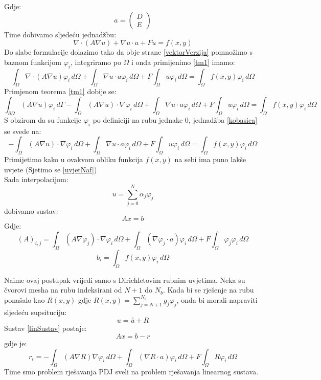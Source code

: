 \documentclass[zavrsnirad]{../fer}
\begin{document}
Gdje:
$$a = 
\begin{pmatrix}
  D\\ 
  E
\end{pmatrix}
$$
Time dobivamo sljedeću jednadžbu:
\begin{equation}
  \label{vektorVerzija}
\nabla \cdot (A \nabla u)  + \nabla u \cdot a + Fu = f(x,y)
\end{equation}
Do slabe formulacije dolazimo tako da obje strane \ref{vektorVerzija} 
pomnožimo
s baznom funkcijom $\varphi_i$, integriramo po $\Omega$
i onda primijenimo  \ref{tm1} 
imamo:
\begin{equation}
  \int_{\Omega}\nabla \cdot (A \nabla u) \varphi_i \, d\Omega  + 
  \int_{\Omega} \nabla u \cdot a\varphi_i \, d\Omega  + F\int_{\Omega}u\varphi_i\,d\Omega  =
  \int_{\Omega}f(x,y)\varphi_i \, d\Omega 
\end{equation}
Primjenom teorema \ref{tm1} 
dobije se:
\begin{equation}
  \label{kobasica}
  \int_{\partial \Omega}(A \nabla u) \varphi_i \, d\Gamma  - 
  \int_{\Omega}(A \nabla u) \cdot \nabla \varphi_i \, d\Omega  + 
  \int_{\Omega} \nabla u \cdot a\varphi_i \, d\Omega  + F\int_{\Omega}u\varphi_i\,d\Omega  =
  \int_{\Omega}f(x,y)\varphi_i \, d\Omega 
\end{equation}
S obzirom da su funkcije $\varphi_i$ po definiciji
na rubu jednake $0$, jednadžba 
\ref{kobasica} se 
svede na:
\begin{equation}
  \label{slabaFor}
  -\int_{\Omega}(A \nabla u) \cdot \nabla \varphi_i \, d\Omega  + 
  \int_{\Omega} \nabla u \cdot a\varphi_i \, d\Omega  + F\int_{\Omega}u\varphi_i\,d\Omega  =
  \int_{\Omega}f(x,y)\varphi_i \, d\Omega 
\end{equation}
Primijetimo kako u ovakvom obliku funkcija $f(x,y)$ 
na sebi ima puno lakše uvjete (Sjetimo se \ref{uvjetNaf})
\bigskip
\\
Sada interpolacijom:
$$u = \sum_{j=0}^N \alpha_j \varphi_j$$
dobivamo sustav:
\begin{equation}
\label{linSustav}
A x = b
\end{equation}
Gdje:
\begin{equation}
\label{elMat}
(A)_{i,j} = \int_{\Omega} (A\nabla \varphi_j) \cdot \nabla \varphi_i \, d\Omega + 
\int_{\Omega} (\nabla \varphi_j \cdot a) \varphi_i \, d\Omega +
F \int_{\Omega} \varphi_j \varphi_i \, d\Omega
\end{equation}
$$b_i = \int_{\Omega} f(x,y) \varphi_i \, d \Omega$$

Naime ovaj postupak vrijedi samo s Dirichletovim
rubnim uvjetima. Neka su čvorovi mesha na rubu indeksirani
od $N+1$ do $N_b$.
Kada bi se rješenje na rubu ponašalo kao
$R(x,y)$ gdje $R(x,y) = \sum_{j=N + 1}^{N_b} g_j \varphi_j$,
onda bi morali napraviti sljedeću
supsituciju:
$$u = \overset{\circ}u + R$$
Sustav \ref{linSustav}
postaje:
$$Ax = b - r$$
gdje je:
$$r_i = - \int_{\Omega}(A\nabla R) \nabla \varphi_i \, d \Omega +
\int_{\Omega}(\nabla R \cdot a) \varphi_i \, d \Omega +
F \int_{\Omega} R \varphi_i\, d\Omega
$$
Time smo problem rješavanja PDJ sveli na problem
rješavanja linearnog sustava.
\end{document}
